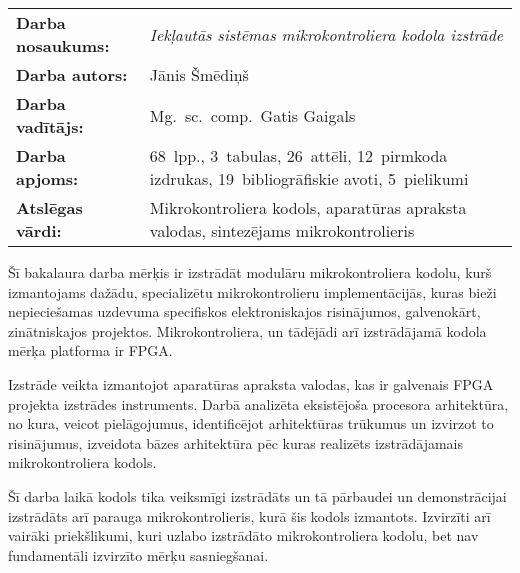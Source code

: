 
\abstitlestyle{\abstractname} %
\noindent%
\begin{tabularx}{\textwidth}{lX}
	\textbf{Darba nosaukums:} & 
		\textit{Iekļautās sistēmas mikrokontroliera kodola izstrāde}\\[1ex]
	\textbf{Darba autors:} & Jānis Šmēdiņš\\[1ex]
	\textbf{Darba vadītājs:} & Mg.~sc.~comp.~Gatis Gaigals\\[1ex]
	\textbf{Darba apjoms:} & 68~lpp., 3~tabulas, 26~attēli,
		12~pirmkoda izdrukas, 19~bibliogrāfiskie avoti, 5~pielikumi\\[1ex]
	\textbf{Atslēgas vārdi:} & Mikrokontroliera kodols, aparatūras apraksta valodas,
		sintezējams mikrokontrolieris
\end{tabularx}

\vspace{1em}
Šī bakalaura darba mērķis ir izstrādāt modulāru mikrokontroliera kodolu,
kurš izmantojams dažādu, specializētu mikrokontrolieru implementācijās,
kuras bieži nepieciešamas uzdevuma specifiskos elektroniskajos risinājumos,
galvenokārt, zinātniskajos projektos. Mikrokontroliera, un tādējādi arī
izstrādājamā kodola mērķa platforma ir FPGA.

Izstrāde veikta izmantojot aparatūras apraksta valodas, kas ir galvenais
FPGA projekta izstrādes instruments. Darbā analizēta eksistējoša procesora
arhitektūra, no kura, veicot pielāgojumus, identificējot arhitektūras 
trūkumus un izvirzot to risinājumus, izveidota bāzes arhitektūra pēc kuras
realizēts izstrādājamais mikrokontroliera kodols.

Šī darba laikā kodols tika veiksmīgi izstrādāts un tā pārbaudei un 
demonstrācijai izstrādāts arī parauga mikrokontrolieris, kurā šis kodols
izmantots. Izvirzīti arī vairāki priekšlikumi, kuri uzlabo izstrādāto
mikrokontroliera kodolu, bet nav fundamentāli izvirzīto mērķu sasniegšanai.

